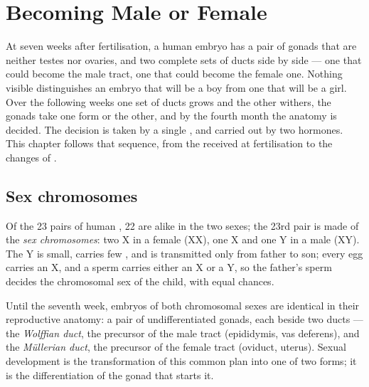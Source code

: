 \chapter{Becoming Male or Female}\label{ch:g11:becoming-male-female}

At seven weeks after fertilisation, a human embryo has a pair of
gonads that are neither testes nor ovaries, and two complete sets of
ducts side by side --- one that could become the male tract, one that
could become the female one. Nothing visible distinguishes an embryo
that will be a boy from one that will be a girl. Over the following
weeks one set of ducts grows and the other withers, the gonads take one
form or the other, and by the fourth month the anatomy is decided. The
decision is taken by a single , and carried out by two hormones.
This chapter follows that sequence, from the  received at
fertilisation to the changes of .

\section{Sex chromosomes}

\begin{definition}\label{def:g11:becoming-male-female:chromosomes}
Of the 23 pairs of human , 22 are alike in the two sexes;
the 23rd pair is made of the \emph{sex chromosomes}:
two X  in a female (XX), one X and one Y in a male (XY).
The Y is small, carries few , and is transmitted only from father
to son; every egg carries an X, and a sperm carries either an X or a
Y, so the father's sperm decides the chromosomal sex of the child, with
equal chances.
\end{definition}

\begin{proposition}\label{prop:g11:becoming-male-female:undifferentiated}
Until the seventh week, embryos of both chromosomal sexes are
identical in their reproductive anatomy: a pair of undifferentiated
gonads, each beside two ducts --- the \emph{Wolffian duct}, the
precursor of the male tract (epididymis, vas deferens), and the
\emph{Müllerian duct}, the precursor of the female tract (oviduct,
uterus). Sexual development is the transformation of this common
plan into one of two forms; it is the differentiation of the gonad
that starts it.
\end{proposition}
\admitted

